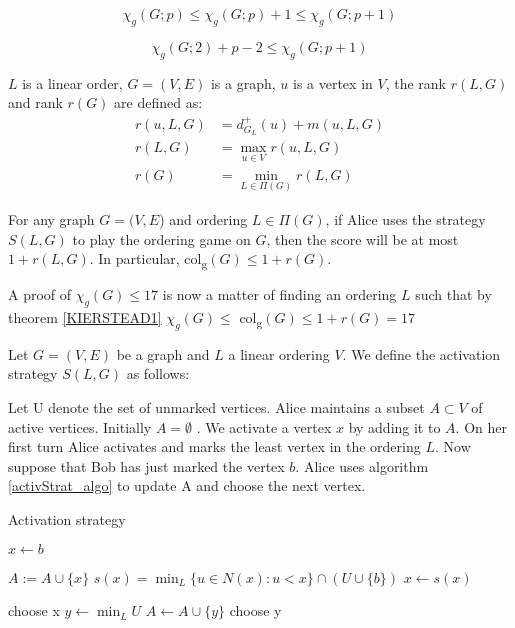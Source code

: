 \begin{theorem}
       
    \[\chi_g(G;p) \leq \chi_g(G;p) +1 \leq \chi_g(G;p+1)\]
    
    \[ \chi_g(G;2) + p -2  \leq \chi_g(G;p+1) \]
    
\end{theorem}

$L$ is a linear order, $G=(V,E)$ is a graph, $u$ is a vertex in $V$, the rank $r(L,G)$ and rank $r(G)$ are defined as:
\begin{align*}
	r(u,L,G) & = d^+_{G_L}(u) + m(u,L,G) \\
	r(L,G)   & = \max_{u \in V}r(u,L,G)  \\
	r(G)     & = \min_{L \in \Pi(G)} r(L,G)
\end{align*}

\begin{theorem} \label{KIERSTEAD1}
    For any graph $G=(V, E$) and ordering $L \in \Pi(G)$, if Alice
    uses the strategy $S(L, G)$ to play the ordering game on $G$, then the score will
    be at most $1+r(L, G)$. In particular, col\textsubscript{g}$(G) \leq 1+r(G)$.
\end{theorem}

A proof of $\chi_g(G) \leq 17$ is now a matter of finding an ordering $L$ such that by theorem \ref{KIERSTEAD1} $\chi_g(G) \leq$ col\textsubscript{g}$(G) \leq 1+r(G) = 17$

\begin{definition} 
    Let $G=(V, E)$ be a graph and $L$ a linear ordering $V$. We define the activation strategy $S(L,G)$ as follows:
    
    Let U denote the set of unmarked vertices. Alice maintains a subset $A \subset V$ of active vertices. Initially $A = \emptyset$ . We activate a vertex $x$ by adding it to $A$. On her first turn Alice activates and marks the least vertex in the ordering $L$. Now suppose that Bob has just marked the vertex $b$. Alice uses algorithm \ref{activStrat_algo} to update A and choose the
    next vertex.
    \begin{algorithm}[h]
        \caption{Activation strategy}
        \label{activStrat_algo}
        \begin{algorithmic}[1]
            \Statex
            \State $x \gets b$ 
            
                \State $A := A \cup \{x\}$
                \State $s(x) =\min_L\{u \in N(x) : u < x\} \cap (U \cup \{b\} )$
                \State $x \gets s(x)$
            \EndWhile      
            
                \State choose x
            \Else
                \State $y \gets \min_L U$
                    \State $A \gets A \cup \{y\}$                    
                \EndIf     
                \State choose y
            \EndIf   
        \end{algorithmic}
    \end{algorithm}
    
\end{definition}


